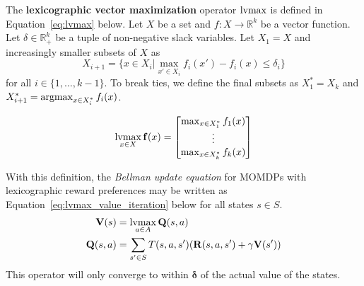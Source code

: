 \begin{definition}
\label{def:lvmax}
The \textbf{lexicographic vector maximization} operator $\operatorname*{lvmax}$ is defined in Equation~\ref{eq:lvmax} below. Let $X$ be a set and $f : X \rightarrow \mathbb{R}^k$ be a vector function. Let $\delta \in \mathbb{R}_+^k$ be a tuple of non-negative slack variables. Let $X_1 = X$ and increasingly smaller subsets of $X$ as
\begin{equation}
    \label{eq:lvmax_X}
    X_{i+1} = \{x \in X_i | \max_{x' \in X_i} f_i(x') - f_i(x) \leq \delta_i \}
\end{equation}
for all $i \in \{1, \ldots, k-1\}$. To break ties, we define the final subsets as $X_1^* = X_k$ and $X_{i+1}^* = \operatorname*{argmax}_{x \in X_i^*} f_i(x)$.

\begin{equation}
    \label{eq:lvmax}
    \operatorname*{lvmax}_{x \in X} \mathbf{f}(x) = \begin{bmatrix}
            \max_{x \in X_1^*} f_1(x) \\
            \vdots \\
            \max_{x \in X_k^*} f_k(x)
        \end{bmatrix}
\end{equation} 
\end{definition}

With this definition, the \emph{Bellman update equation} for MOMDPs with lexicographic reward preferences may be written as Equation~\ref{eq:lvmax_value_iteration} below for all states $s \in S$.
\begin{align}
    \mathbf{V}(s) &= \operatorname*{lvmax}_{a \in A} \mathbf{Q}(s, a) \label{eq:lvmax_value_iteration} \\
    \mathbf{Q}(s, a) &= \sum_{s' \in S} T(s, a, s') (\mathbf{R}(s, a, s') + \gamma \mathbf{V}(s')) \label{eq:lvmax_Q}
\end{align}
This operator will only converge to within $\mathbf{\delta}$ of the actual value of the states.
